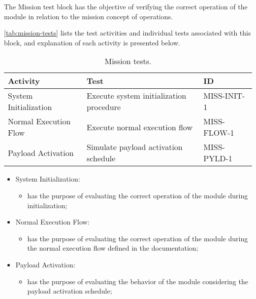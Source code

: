 The Mission test block has the objective of verifying the correct operation of the module in relation to the mission concept of operations.

\autoref{tab:mission-tests} lists the test activities and individual tests associated with this block, and explanation of each activity is presented below.


\begin{table}[htp]
    \small
    \centering
    \begin{tabular}{lll}
        \toprule
        \textbf{Activity}                      & \textbf{Test}                                  & \textbf{ID}   \\
        \midrule
        \midrule
        \multirow{1}{*}{System Initialization} & Execute system initialization procedure       & MISS-INIT-1     \\
        \midrule
        \multirow{1}{*}{Normal Execution Flow} & Execute normal execution flow                 & MISS-FLOW-1     \\
        \midrule
        \multirow{1}{*}{Payload Activation}    & Simulate payload activation schedule          & MISS-PYLD-1     \\
        \bottomrule
    \end{tabular}
    \caption{Mission tests.}
    \label{tab:mission-tests}
\end{table}

\begin{itemize}
    \item System Initialization:
    \begin{itemize}
        \item has the purpose of evaluating the correct operation of the module during initialization;
    \end{itemize}

    \item Normal Execution Flow:
    \begin{itemize}
        \item has the purpose of evaluating the correct operation of the module during the normal execution flow defined in the documentation;
    \end{itemize}

    \item Payload Activation:
    \begin{itemize}
        \item has the purpose of evaluating the behavior of the module considering the payload activation schedule;
    \end{itemize}

\end{itemize}


